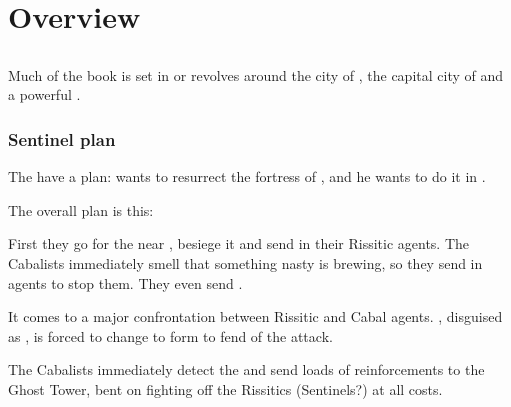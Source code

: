 
















\section{Overview}

\begin{comment}

\end{comment}









\subsection[Malcur]{\Malcur}
Much of the book is set in or revolves around the city of , the capital city of  and a powerful .





\subsubsection{Sentinel plan}
The  have a plan: 
 wants to resurrect the \draconic{} fortress of , and he wants to do it in \Malcur. 

The overall plan is this:

First they go for the  near , besiege it and send in their Rissitic agents. 
The Cabalists immediately smell that something nasty is brewing, so they send in agents to stop them. 
They even send \banes. 

It comes to a major confrontation between Rissitic and Cabal agents. 
, disguised as , is forced to change to \draconic{} form to fend of the \bane{} attack. 

The Cabalists immediately detect the \dragon{} and send loads of reinforcements to the Ghost Tower, bent on fighting off the Rissitics (Sentinels?) at all costs. 

